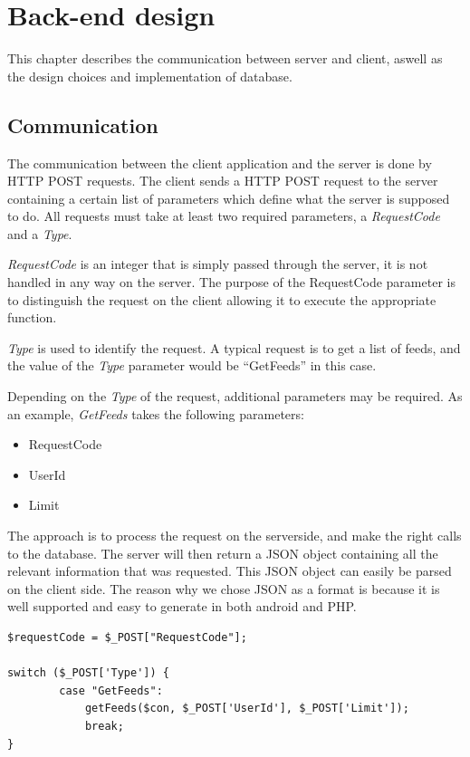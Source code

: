 \chapter{Back-end design}
This chapter describes the communication between server and client, aswell as the design choices and
implementation of database. 

\section{Communication}
\label{sec:com}

The communication between the client application and the server is done by HTTP POST requests.
The client sends a HTTP POST request to the server containing a certain list of parameters which
define what the server is supposed to do. All requests must take at least two required parameters, a \textit{RequestCode} and a
\textit{Type}.

\textit{RequestCode} is an integer that is simply passed through the server, it is not handled in any
way on the server. The purpose of the RequestCode parameter is to distinguish the request on the client allowing
it to execute the appropriate function.

\textit{Type} is used to identify the request. A typical request is to get a list of feeds, and the
value of the \textit{Type} parameter would be ``GetFeeds'' in this case.

Depending on the \textit{Type} of the request, additional parameters may be required. As an example, \textit{GetFeeds} takes the following parameters:
\begin{itemize}
\item RequestCode
\item UserId
\item Limit
\end{itemize}

The approach is to process the request on the serverside, and make the right calls to the
database. The server will then return a JSON object containing all the relevant information that was
requested. This JSON object can easily be parsed on the client side. The reason why we chose JSON as
a format is because it is well supported and easy to generate in both android and PHP.

\begin{lstlisting}[language=phpstyle, caption=getFeeds function call]
$requestCode = $_POST["RequestCode"];

switch ($_POST['Type']) {
        case "GetFeeds":
            getFeeds($con, $_POST['UserId'], $_POST['Limit']);
            break;
}
\end{lstlisting}

